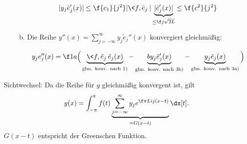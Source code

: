 \begin{ex}
\begin{enumerate}[1)]
\begin{enumerate}[a)]
					\begin{align*}
						|y_j \tilde e_j'(x)| \le \f {c_1}{j^2} |\<f,\tilde e_j\>| \underbrace{|\tilde e_j'(x)|}_{\le \f j {\sqrt{2L}}} \le \f {c^2}{j^2}
					\end{align*}
				\item
					Die Reihe $y''(x) = \sum_{j=-\infty}^\infty y_j \tilde e_j''(x)$ konvergiert gleichmäßig:

					\begin{align*}
						y_j e_j''(x)
						= \f 1{a} \Big(\underbrace{\<f, \tilde e_j\> \tilde e_j(x)}_{\text{glm. konv. nach 1)}} - \underbrace{b y_j \tilde e_j'(x)}_{\text{glm. konv. nach 3b)}} - \underbrace{y_j \tilde e_j(x)}_{\text{glm. konv. nach 3a)}} \Big)
					\end{align*}
			\end{enumerate}
	\end{enumerate}

	Sichtwechsel: Da die Reihe für $y$ gleichmäßig konvergent ist, gilt
	\begin{align*}
		y(x) = \int_{-\pi}^\pi f(t) \underbrace{\sum_{j=-\infty}^\infty y_j e^{\f \pi L ij(x-t)}}_{=G(x-t)} \dx[t].
	\end{align*}
	$G(x-t)$ entspricht der Greenschen Funktion.
\end{ex}

